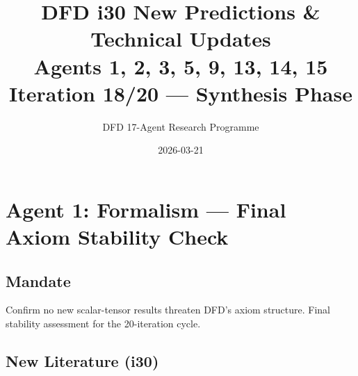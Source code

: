 \documentclass[11pt,a4paper]{article}
\title{DFD i30 New Predictions \& Technical Updates\\Agents 1, 2, 3, 5, 9, 13, 14, 15\\[6pt]\large Iteration 18/20 --- Synthesis Phase}
\author{DFD 17-Agent Research Programme}
\date{2026-03-21}
\begin{document}
\maketitle
\tableofcontents
\newpage

\section{Agent 1: Formalism --- Final Axiom Stability Check}

\subsection{Mandate}
Confirm no new scalar-tensor results threaten DFD's axiom structure. Final stability assessment for the 20-iteration cycle.

\subsection{New Literature (i30)}
\end{document}
